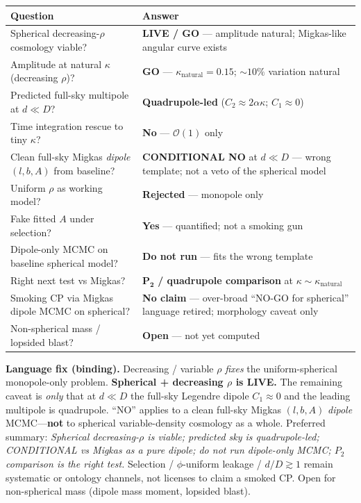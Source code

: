 \documentclass[11pt,a4paper]{article}
\begin{document}
\begin{table}[ht]
\centering
\begin{tabular}{@{}p{7cm}p{7cm}@{}}
\toprule
Question & Answer \\
\midrule
Spherical decreasing-\(\rho\) cosmology viable? & \textbf{LIVE / GO} --- amplitude natural; Migkas-like angular curve exists \\
Amplitude at natural \(\kappa\) (decreasing \(\rho\))? & \textbf{GO} --- \(\kappa_{\mathrm{natural}}=0.15\); \(\sim 10\%\) variation natural \\
Predicted full-sky multipole at \(d\ll D\)? & \textbf{Quadrupole-led} (\(C_2\approx 2\alpha\kappa\); \(C_1\approx 0\)) \\
Time integration rescue to tiny \(\kappa\)? & \textbf{No} --- \(\mathcal{O}(1)\) only \\
Clean full-sky Migkas \emph{dipole} \((l,b,A)\) from baseline? & \textbf{CONDITIONAL NO} at \(d\ll D\) --- wrong template; not a veto of the spherical model \\
Uniform \(\rho\) as working model? & \textbf{Rejected} --- monopole only \\
Fake fitted \(A\) under selection? & \textbf{Yes} --- quantified; not a smoking gun \\
Dipole-only MCMC on baseline spherical model? & \textbf{Do not run} --- fits the wrong template \\
Right next test vs Migkas? & \(\boldsymbol{P_2}\) \textbf{/ quadrupole comparison} at \(\kappa\sim\kappa_{\mathrm{natural}}\) \\
Smoking CP via Migkas dipole MCMC on spherical? & \textbf{No claim} --- over-broad ``NO-GO for spherical'' language retired; morphology caveat only \\
Non-spherical mass / lopsided blast? & \textbf{Open} --- not yet computed \\
\bottomrule
\end{tabular}
\end{table}

\textbf{Language fix (binding).} Decreasing / variable \(\rho\) \emph{fixes} the uniform-spherical monopole-only problem. \textbf{Spherical + decreasing \(\rho\) is LIVE.} The remaining caveat is \emph{only} that at \(d\ll D\) the full-sky Legendre dipole \(C_1\approx 0\) and the leading multipole is quadrupole. ``NO'' applies to a clean full-sky Migkas \((l,b,A)\) \emph{dipole} MCMC---\textbf{not} to spherical variable-density cosmology as a whole. Preferred summary: \emph{Spherical decreasing-\(\rho\) is viable; predicted sky is quadrupole-led; CONDITIONAL vs Migkas as a pure dipole; do not run dipole-only MCMC; \(P_2\) comparison is the right test.} Selection / \(\phi\)-uniform leakage / \(d/D\gtrsim 1\) remain systematic or ontology channels, not licenses to claim a smoked CP. Open for non-spherical mass (dipole mass moment, lopsided blast).
\end{document}
